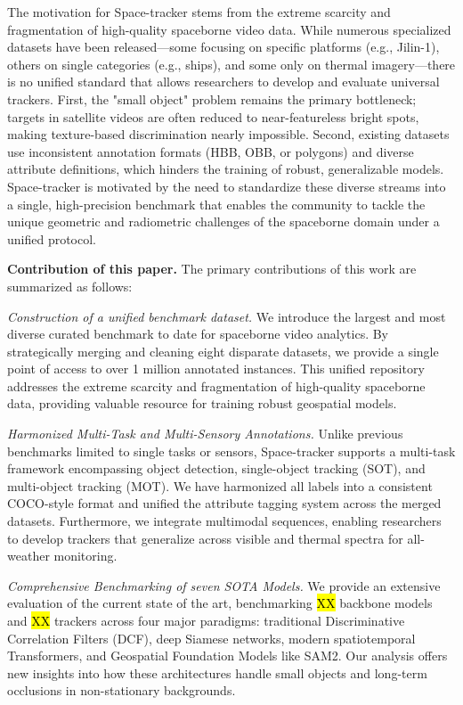 \documentclass{article}
\begin{document}
The motivation for Space-tracker stems from the extreme scarcity and
fragmentation of high-quality spaceborne video data. While numerous specialized
datasets have been released—some focusing on specific platforms (e.g., Jilin-1),
others on single categories (e.g., ships), and some only on thermal
imagery—there is no unified standard that allows researchers to develop and
evaluate universal trackers. First, the "small object" problem remains the
primary bottleneck; targets in satellite videos are often reduced to
near-featureless bright spots, making texture-based discrimination nearly
impossible. Second, existing datasets use inconsistent annotation formats (HBB, OBB, or polygons) and diverse attribute definitions, which hinders the training of robust, generalizable models. %
Space-tracker is motivated by the need to standardize these diverse streams into a single, high-precision
benchmark that enables the community to tackle the unique geometric and
radiometric challenges of the spaceborne domain under a unified protocol.

\noindent\textbf{Contribution of this paper.}
The primary contributions of this work are summarized as follows:

\noindent \textit{Construction of a unified benchmark dataset.} We introduce the largest and most diverse curated benchmark to date for spaceborne video analytics. By strategically merging and cleaning eight disparate
datasets, we provide a single point of access to over 1 million annotated instances. This unified repository
addresses the extreme scarcity and fragmentation of high-quality spaceborne data, providing valuable resource for training robust geospatial models.

\noindent\textit{Harmonized Multi-Task and Multi-Sensory Annotations.} Unlike previous benchmarks limited to single tasks or sensors, Space-tracker supports a multi-task framework encompassing object detection, single-object tracking
(SOT), and multi-object tracking (MOT). We have harmonized all labels into a consistent COCO-style format and unified the attribute tagging system across the merged datasets. Furthermore, we integrate multimodal sequences, enabling researchers to develop trackers that generalize across visible and thermal spectra for all-weather monitoring.

\noindent\textit{Comprehensive Benchmarking of seven SOTA Models.} We provide an extensive evaluation of the current state of the art, benchmarking \hl{XX} backbone
models and \hl{XX} trackers across four major paradigms: traditional Discriminative Correlation Filters (DCF), deep Siamese networks, modern spatiotemporal Transformers, and Geospatial Foundation Models like SAM2. Our analysis offers
new insights into how these architectures handle small objects and long-term occlusions in non-stationary backgrounds.
\end{document}
